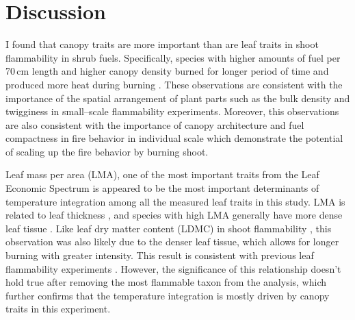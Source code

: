 \documentclass[12pt]{report}
\begin{document}
\section{Discussion}

I found that canopy traits are more important than are leaf traits in shoot flammability in shrub fuels. %
Specifically, species with higher amounts of fuel per 70\,cm length and higher canopy density burned for longer period of time and produced more heat during burning . These observations are consistent with the importance of the spatial arrangement of plant parts such as the bulk density \citep{pausas2012fires} and twigginess \citep{potts2022growth} in small--scale flammability experiments. Moreover, this observations are also consistent with the importance of canopy architecture and fuel compactness  in fire behavior in individual scale \citep{schwilk2003flammability, madrigal2012evaluation} which demonstrate the potential of scaling up the fire behavior by burning shoot.





Leaf mass per area (LMA), one of the most important traits from the Leaf Economic Spectrum \citep{wright2004worldwide} is appeared to be the most important determinants of temperature integration among all the measured leaf traits in this study. LMA is related to leaf thickness \citep{niinemets1999research}, and species with high LMA generally have more dense leaf tissue \citep{poorter2009causes}. Like leaf dry matter content (LDMC) in shoot flammability \citep{alam2020shoot, potts2022growth}, this observation
was also likely due to the denser leaf tissue, which allows for longer burning with greater intensity. This result is consistent with previous leaf flammability experiments \citep{krix2018landscape}.
However, the significance of this relationship doesn’t hold true after removing the most flammable taxon from the analysis, which further confirms that the temperature integration is mostly driven by canopy traits in this experiment.\\
\end{document}
